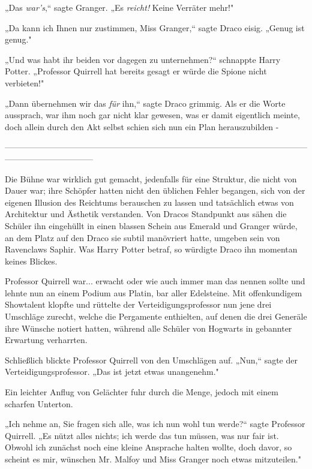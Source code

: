 {„Das \emph{war's},“ sagte Granger. „Es \emph{reicht!} Keine Verräter mehr!"

„Da kann ich Ihnen nur zustimmen, Miss Granger,“ sagte Draco eisig. „Genug ist genug."

„Und was habt ihr beiden vor dagegen zu unternehmen?“ schnappte Harry Potter. „Professor Quirrell hat bereits gesagt er würde die Spione nicht verbieten!"

„Dann übernehmen wir das \emph{für} ihn,“ sagte Draco grimmig. Als er die Worte aussprach, war ihm noch gar nicht klar gewesen, was er damit eigentlich meinte, doch allein durch den Akt selbst schien sich nun ein Plan herauszubilden -

--------------------------------------------------------------------------------------------------------------------------------------------

\hfill\break Die Bühne war wirklich gut gemacht, jedenfalls für eine Struktur, die nicht von Dauer war; ihre Schöpfer hatten nicht den üblichen Fehler begangen, sich von der eigenen Illusion des Reichtums berauschen zu lassen und tatsächlich etwas von Architektur und Ästhetik verstanden. Von Dracos Standpunkt aus sähen die Schüler ihn eingehüllt in einen blassen Schein aus Emerald und Granger würde, an dem Platz auf den Draco sie subtil manövriert hatte, umgeben sein von Ravenclaws Saphir. Was Harry Potter betraf, so würdigte Draco ihn momentan keines Blickes.

Professor Quirrell war... erwacht oder wie auch immer man das nennen sollte und lehnte nun an einem Podium aus Platin, bar aller Edelsteine. Mit offenkundigem Showtalent klopfte und rüttelte der Verteidigungsprofessor nun jene drei Umschläge zurecht, welche die Pergamente enthielten, auf denen die drei Generäle ihre Wünsche notiert hatten, während alle Schüler von Hogwarts in gebannter Erwartung verharrten.

Schließlich blickte Professor Quirrell von den Umschlägen auf. „Nun,“ sagte der Verteidigungsprofessor. „Das ist jetzt etwas unangenehm."

Ein leichter Anflug von Gelächter fuhr durch die Menge, jedoch mit einem scharfen Unterton.

„Ich nehme an, Sie fragen sich alle, was ich nun wohl tun werde?“ sagte Professor Quirrell. „Es nützt alles nichts; ich werde das tun müssen, was nur fair ist. Obwohl ich zunächst noch eine kleine Ansprache halten wollte, doch davor, so scheint es mir, wünschen Mr. Malfoy und Miss Granger noch etwas mitzuteilen."

}
